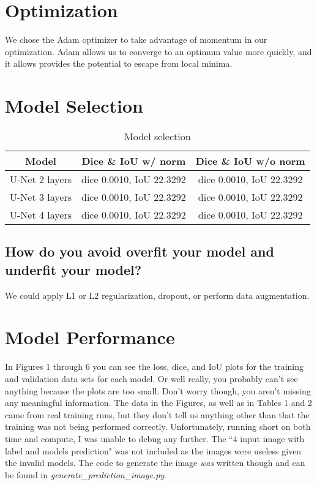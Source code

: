 \documentclass{article}
\begin{document}
\section{Optimization}
We chose the Adam optimizer to take advantage of momentum in our optimization.
Adam allows us to converge to an optimum value more quickly, and it allows
provides the potential to escape from local minima.

\section{Model Selection}
\begin{table}[h]
\begin{center}
\begin{tabular}{c|c|c}
    Model & Dice \& IoU w/ norm & Dice \& IoU w/o norm \\
    \hline
    U-Net 2 layers & dice 0.0010, IoU 22.3292 & dice 0.0010, IoU 22.3292 \\
    U-Net 3 layers & dice 0.0010, IoU 22.3292 & dice 0.0010, IoU 22.3292 \\
    U-Net 4 layers & dice 0.0010, IoU 22.3292 & dice 0.0010, IoU 22.3292
\end{tabular}
\end{center}
\caption{Model selection}
\label{table:model_selection}
\end{table}

\subsection{How do you avoid overfit your model and underfit your model?}
We could apply L1 or L2 regularization, dropout, or perform data augmentation.

\section{Model Performance}

In Figures 1 through 6 you can see the loss, dice, and IoU plots for the
training and validation data sets for each model. Or well really, you probably
can't see anything because the plots are too small. Don't worry though, you aren't
missing any meaningful information. The data in the Figures, as well as in Tables
1 and 2 came from real training runs, but they don't tell us anything other than
that the training was not being performed correctly. Unfortunately, running short
on both time and compute, I was unable to debug any further. The ``4 input image
with label and models prediction" was not included as the images were useless
given the invalid models. The code to generate the image \textit{was} written
though and can be found in \textit{generate\_prediction\_image.py}.
\end{document}
